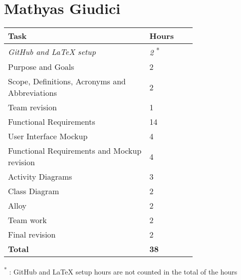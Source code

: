 \section{Mathyas Giudici}

\smallskip
\begin{center}
\begin{tabular}{ | p{0.75\linewidth} | l | }
  \hline
    \textbf{Task} & \textbf{Hours }\\ \hline
    \textit{GitHub and LaTeX setup} & \textit{2} \textsuperscript{*} \\ \hline
    Purpose and Goals & 2 \\ \hline
    Scope, Definitions, Acronyms and Abbreviations & 2 \\ \hline
    Team revision & 1 \\ \hline
    Functional Requirements & 14 \\ \hline
    User Interface Mockup & 4 \\ \hline
    Functional Requirements and Mockup revision & 4 \\ \hline
    Activity Diagrams & 3 \\ \hline
    Class Diagram & 2 \\ \hline
    Alloy & 2 \\ \hline
    Team work & 2 \\ \hline
    Final revision & 2 \\ \hline
    \textbf{Total} & \textbf{38} \\ \hline
\end{tabular}
\end{center}

\textsuperscript{*} : GitHub and LaTeX setup hours are not counted in the total of the hours

\clearpage
